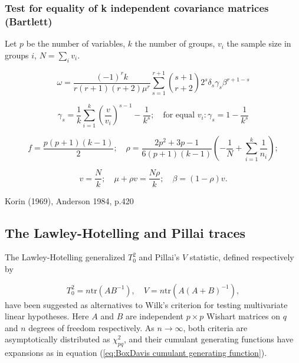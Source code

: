 \subsubsection{Test for equality of k independent covariance matrices (Bartlett)}

Let $p$ be the number of variables, $k$ the number of groups, $v_i$ the sample size in groups $i$, $N=\sum_i v_i$.

\begin{equation}
	\omega = \frac{(-1)^{r}k}{r(r+1)(r+2) \mu^r} \sum_{s=1}^{r+1} \binom{s+1}{r+2} 2^s \delta_s \gamma_s \beta^{r+1-s} 
\end{equation}

\begin{equation}
	\gamma_s = \frac{1}{k} \sum_{i=1}^{k} \left( \frac{v}{v_i} \right)^{s-1}-\frac{1}{k^s}; \quad \text{for equal } v_i: \gamma_s = 1-\frac{1}{k^s}
\end{equation}


\begin{equation}
	f=\frac{p(p+1)(k-1)}{2} ; \quad \rho=\frac{2p^2+3p-1}{6(p+1)(k-1)} \left(-\frac{1}{N}  +\sum_{i=1}^k \frac{1}{n_i}  \right);
\end{equation}

\begin{equation}
	v=\frac{N}{k}; \quad \mu+\rho v=\frac{N\rho}{k}; \quad  \beta=(1-\rho)v.
\end{equation}

Korin (1969), Anderson 1984, p.420






\subsection{The Lawley-Hotelling and Pillai traces}
\label{BoxDavis:The Lawley-Hotelling and Pillai traces}

The Lawley-Hotelling generalized $T_0^2$ and Pillai's $V$ statistic, defined respectively by

\begin{equation}
	T_0^2 = n \text{tr} (AB^{-1}), \quad V = n \text{tr} (A(A+B)^{-1}),
\end{equation}
have been suggested as alternatives to Wilk's criterion for testing multivariate linear hypotheses. Here $A$ and $B$ are independent $p \times p$ Wishart matrices on $q$ and $n$ degrees of freedom respectively. As $n \rightarrow \infty$, both criteria are asymptotically distributed as $\chi^2_{pq}$, and their cumulant generating functions have expansions as in equation (\ref{eq:BoxDavis cumulant generating function}).

